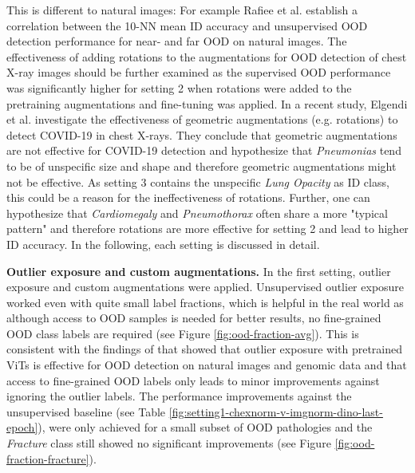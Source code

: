 This is different to natural images: For example Rafiee et al. \citep{Rafiee2022} establish a correlation between the 10-NN mean ID accuracy and unsupervised OOD detection performance for near- and far OOD on natural images.
The effectiveness of adding rotations to the augmentations for OOD detection of chest X-ray images should be further examined as the supervised OOD performance was significantly higher for setting 2 when rotations were added to the pretraining augmentations and fine-tuning was applied.
In a recent study, Elgendi et al. \citep{Elgendi2021} investigate the effectiveness of geometric augmentations (e.g. rotations) to detect COVID-19 in chest X-rays.
They conclude that geometric augmentations are not effective for COVID-19 detection and hypothesize \citep{Elgendi2021} that \textit{Pneumonias} tend to be of unspecific size and shape and therefore geometric augmentations might not be effective.
As setting 3 contains the unspecific \textit{Lung Opacity} as ID class, this could be a reason for the ineffectiveness of rotations.
Further, one can hypothesize that \textit{Cardiomegaly} and \textit{Pneumothorax} often share a more "typical pattern" and therefore rotations are more effective for setting 2 and lead to higher ID accuracy.
In the following, each setting is discussed in detail.
\par
\textbf{Outlier exposure and custom augmentations.}
In the first setting, outlier exposure and custom augmentations were applied.
Unsupervised outlier exposure worked even with quite small label fractions, which is helpful in the real world as although access to OOD samples is needed for better results, no fine-grained OOD class labels are required (see Figure \ref{fig:ood-fraction-avg}).
This is consistent with the findings of \citep{Fort2021} that showed that outlier exposure with pretrained ViTs is effective for OOD detection on natural images and genomic data and that access to fine-grained OOD labels only leads to minor improvements against ignoring the outlier labels.
The performance improvements against the unsupervised baseline (see Table \ref{fig:setting1-chexnorm-v-imgnorm-dino-last-epoch}), were only achieved for a small subset of OOD pathologies and the \textit{Fracture} class still showed no significant improvements (see Figure \ref{fig:ood-fraction-fracture}).
